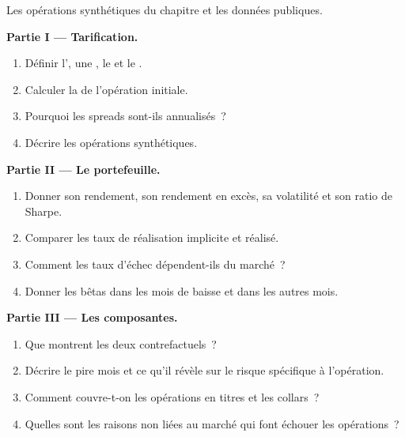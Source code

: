 \begin{problem}\label{pb:s1:merger-arbitrage:1}
Les opérations synthétiques du chapitre et les données publiques.

\medskip\noindent\textbf{Partie I --- Tarification.}
\begin{enumerate}
\item Définir l', une , le  et le .
\item Calculer la  de l'opération initiale.
\item Pourquoi les spreads sont-ils annualisés~?
\item Décrire les opérations synthétiques.
\end{enumerate}

\medskip\noindent\textbf{Partie II --- Le portefeuille.}
\begin{enumerate}[resume]
\item Donner son rendement, son rendement en excès, sa volatilité et son ratio de Sharpe.
\item Comparer les taux de réalisation implicite et réalisé.
\item Comment les taux d'échec dépendent-ils du marché~?
\item Donner les bêtas dans les mois de baisse et dans les autres mois.
\end{enumerate}

\medskip\noindent\textbf{Partie III --- Les composantes.}
\begin{enumerate}[resume]
\item Que montrent les deux contrefactuels~?
\item Décrire le pire mois et ce qu'il révèle sur le risque spécifique à l'opération.
\item Comment couvre-t-on les opérations en titres et les collars~?
\item Quelles sont les raisons non liées au marché qui font échouer les opérations~?
\end{enumerate}


\end{problem}
